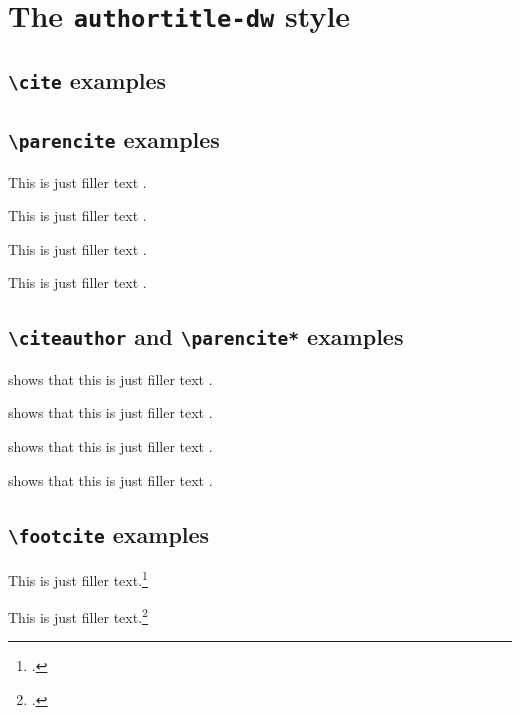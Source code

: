 \documentclass[a4paper]{article}
\newcommand{\cmd}[1]{\texttt{\textbackslash #1}}
\begin{document}
\section*{The \texttt{authortitle-dw} style}

\subsection*{\cmd{cite} examples}

\cite{aristotle:rhetoric}

\cite[59]{aristotle:rhetoric}

\cite[See][]{springer}

\cite[See][59--63]{springer}

\subsection*{\cmd{parencite} examples}

This is just filler text \parencite{aristotle:rhetoric}.

This is just filler text \parencite[59]{aristotle:rhetoric}.

This is just filler text \parencite[See][]{springer}.

This is just filler text \parencite[See][59--63]{springer}.

\subsection*{\cmd{citeauthor} and \cmd{parencite*} examples}

\citeauthor{aristotle:rhetoric} shows that this is just filler
text \parencite*{aristotle:rhetoric}.

\citeauthor{aristotle:rhetoric} shows that this is just filler
text \parencite*[59]{aristotle:rhetoric}.

\citeauthor{springer} shows that this is just filler
text \parencite*[See][]{springer}.

\citeauthor{springer} shows that this is just filler
text \parencite*[See][59--63]{springer}.

\subsection*{\cmd{footcite} examples}

This is just filler text.\footcite{aristotle:rhetoric}

This is just filler text.\footcite[59]{aristotle:rhetoric}
\end{document}
